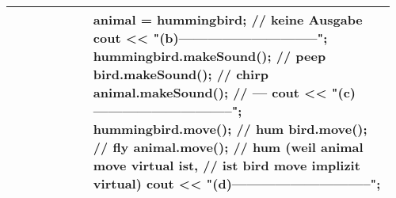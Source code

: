 \documentclass[main.tex,fontsize=8pt,paper=a4,paper=portrait,DIV=calc,]{scrartcl}
\begin{document}
\begin{table}[ht!]
\begin{tabular}{|m{0.2\linewidth}|m{0.755\linewidth}|}
\begin{lstlisting}
struct Bird : Animal {
    virtual auto makeSound() -> void { cout << "chirp\n"; }
    auto move() -> void { cout << "fly\n"; }

    Bird() { cout << "bird hatched\n"; }
    ~Bird() { cout << "bird crashed\n"; }
};

struct Hummingbird : Bird {
    auto makeSound() -> void { cout << "peep\n"; }
    virtual auto move() -> void { cout << "hum\n"; }

    Hummingbird() { cout << "hummingbird hatched\n"; }
    ~Hummingbird() { cout << "hummingbird died\n"; }
};

auto main() -> int {
    cout << "(a)----------------------------\n";
    Hummingbird hummingbird;        // animal born
    Bird bird = hummingbird;        // keine Ausgabe
    Animal &animal = hummingbird;   // keine Ausgabe
    cout << "(b)-----------------------------\n";
    hummingbird.makeSound();        // peep
    bird.makeSound();               // chirp
    animal.makeSound();             // ---
    cout << "(c)-----------------------------\n";
    hummingbird.move();             // hum
    bird.move();                    // fly
    animal.move();                  // hum (weil animal move virtual ist, 
                                    // ist bird move implizit virtual)
    cout << "(d)-----------------------------\n";
}
\end{lstlisting}
\\
\hline
\end{tabular}
\end{table}
\pagebreak
\end{document}

